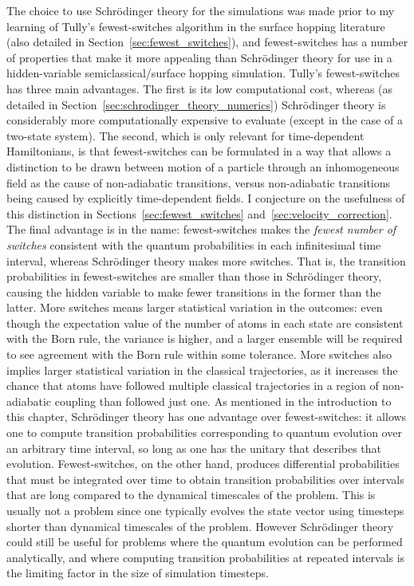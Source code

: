 The choice to use Schr\"odinger theory for the simulations was made prior to my learning of Tully's fewest-switches algorithm in the surface hopping literature~\cite{doi:10.1063/1.459170, doi:10.1146/annurev-physchem-040215-112245, doi:10.1063/1.2715585} (also detailed in Section~\ref{sec:fewest_switches}), and fewest-switches has a number of properties that make it more appealing than Schr\"odinger theory for use in a hidden-variable semiclassical/surface hopping simulation. Tully's fewest-switches has three main advantages. The first is its low computational cost, whereas (as detailed in Section~\ref{sec:schrodinger_theory_numerics}) Schr\"odinger theory is considerably more computationally expensive to evaluate (except in the case of a two-state system). The second, which is only relevant for time-dependent Hamiltonians, is that fewest-switches can be formulated in a way that allows a distinction to be drawn between motion of a particle through an inhomogeneous field as the cause of non-adiabatic transitions, versus non-adiabatic transitions being caused by explicitly time-dependent fields. I conjecture on the usefulness of this distinction in Sections~\ref{sec:fewest_switches} and~\ref{sec:velocity_correction}. The final advantage is in the name: fewest-switches makes the \emph{fewest number of switches} consistent with the quantum probabilities in each infinitesimal time interval, whereas Schr\"odinger theory makes more switches. That is, the transition probabilities in fewest-switches are smaller than those in Schr\"odinger theory, causing the hidden variable to make fewer transitions in the former than the latter. More switches means larger statistical variation in the outcomes: even though the expectation value of the number of atoms in each state are consistent with the Born rule, the variance is higher, and a larger ensemble will be required to see agreement with the Born rule within some tolerance. More switches also implies larger statistical variation in the classical trajectories, as it increases the chance that atoms have followed multiple classical trajectories in a region of non-adiabatic coupling than followed just one. As mentioned in the introduction to this chapter, Schr\"odinger theory has one advantage over fewest-switches: it allows one to compute transition probabilities corresponding to quantum evolution over an arbitrary time interval, so long as one has the unitary that describes that evolution. Fewest-switches, on the other hand, produces differential probabilities that must be integrated over time to obtain transition probabilities over intervals that are long compared to the dynamical timescales of the problem. This is usually not a problem since one typically evolves the state vector using timesteps shorter than dynamical timescales of the problem. However Schr\"odinger theory could still be useful for problems where the quantum evolution can be performed analytically, and where computing transition probabilities at repeated intervals is the limiting factor in the size of simulation timesteps.

